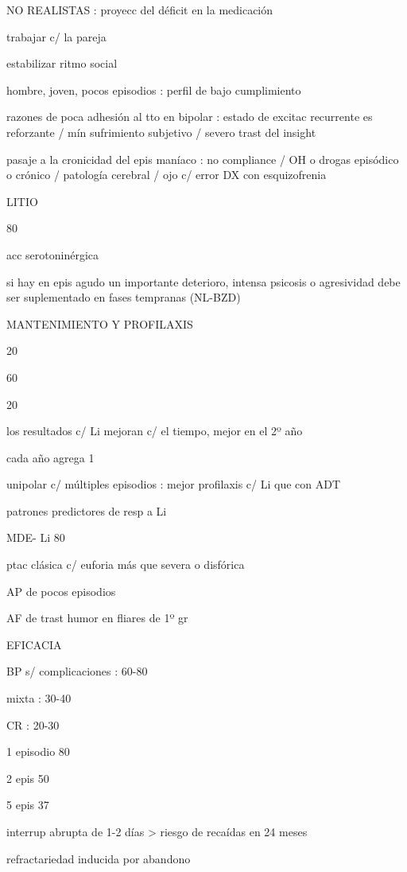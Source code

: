 NO REALISTAS : proyecc del déficit en la medicación

trabajar c/ la pareja

estabilizar ritmo social

hombre, joven, pocos episodios : perfil de bajo cumplimiento

razones de poca adhesión al tto en bipolar : estado de excitac recurrente es reforzante / mín sufrimiento subjetivo / severo trast del insight

pasaje a la cronicidad del epis maníaco : no compliance / OH o drogas episódico o crónico / patología cerebral / ojo c/ error DX con esquizofrenia

LITIO

80%

acc serotoninérgica

si hay en epis agudo un importante deterioro, intensa psicosis o agresividad debe ser suplementado en fases tempranas (NL-BZD)

MANTENIMIENTO Y PROFILAXIS

20 %

60 %

20 %

los resultados c/ Li mejoran c/ el tiempo, mejor en el 2º año

cada año agrega 1%

unipolar c/ múltiples episodios : mejor profilaxis c/ Li que con ADT

patrones predictores de resp a Li

MDE- Li 80%

ptac clásica c/ euforia más que severa o disfórica

AP de pocos episodios

AF de trast humor en fliares de 1º gr

EFICACIA

BP s/ complicaciones : 60-80%

mixta : 30-40%

CR : 20-30%

1 episodio 80%

2 epis 50%

5 epis 37%

interrup abrupta de 1-2 días > riesgo de recaídas en 24 meses

refractariedad inducida por abandono

